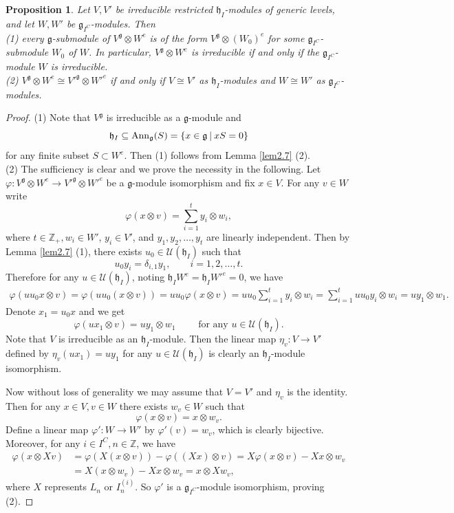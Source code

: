 \documentclass[12pt, reqno]{amsart}
\numberwithin{equation}{section}
\newtheorem{proposition}[theorem]{Proposition}%
\numberwithin{equation}{section}
\def\dt{\delta}
\def\h{\mathfrak{h}}
\def\g{\mathfrak{g}}
\def\vf{\varphi}
\def\gic{{\g_{I^C}}}
\def\U{\mathcal{U}}
\newcommand{\Z}{\mathbb{Z}}
\newcommand{\elei}[2]{I_{#1}^{(#2)}}
\begin{document}
\begin{proposition}\label{proptengmod}
 Let $V,V'$ be irreducible restricted $\h_I$-modules of generic levels,
 and let $W,W'$ be $\g_{I^C}$-modules.
Then\\
 (1) every $\g$-submodule of $V^{\g}\otimes W^e$ is of the form $V^\g\otimes (W_0)^e$ for some $\gic$-submodule $W_0$ of $W$. In particular,  $V^{\g}\otimes W^e$ is irreducible if and only if the $\gic$-module $W$ is irreducible.\\
 (2)  $V^{\g}\otimes W^e\cong V'^{\g}\otimes W'^e$ if and only if $V\cong V'$ as $\h_I$-modules and $W\cong W'$ as $\gic$-modules.
\end{proposition}
\begin{proof}
 (1) Note that $V^\g$ is irreducible as a $\g$-module and
  $$\h_{I}\subseteq\mathrm{Ann}_\g(S)=\{x\in\g\ \vline\ xS=0\}$$
  for any finite subset $S\subset W^e$.
  Then (1) follows from Lemma \ref{lem2.7} (2).\\
  (2) The sufficiency is clear and we prove the necessity in the following.
  Let $\vf:V^{\g}\otimes W^e\longrightarrow V'^{\g}\otimes W'^e$ be
  a $\g$-module isomorphism and fix $x\in V$.
  For any $v\in W$ write
  $$\vf(x\otimes v)=\sum_{i=1}^ty_i\otimes w_i,$$
  where $t\in\Z_+, w_i\in W'$, $y_i\in V'$, and $y_1,y_2,\dots,y_t$ are linearly independent.
  Then by Lemma \ref{lem2.7} (1), there exists $u_0\in\U(\h_I)$ such that
  $$u_0y_i=\dt_{i,1}y_1,\qquad i=1,2,\dots,t.$$
  Therefore for any $u\in\U(\h_I)$, noting $\h_IW^e=\h_IW'^e=0$, we have
  \begin{align*}
   \vf(uu_0x\otimes v)=\vf(uu_0(x\otimes v))=uu_0\vf(x\otimes v)=uu_0\sum_{i=1}^ty_i\otimes w_i
   =\sum_{i=1}^tuu_0y_i\otimes w_i=uy_1\otimes w_1.
  \end{align*}
  Denote $x_1=u_0x$ and we get
  $$\vf(ux_1\otimes v)=uy_1\otimes w_1\qquad\text{ for any }u\in\U(\h_I).$$
  Note that $V$ is irreducible as an $\h_I$-module.
  Then the linear map $\eta_v:V\longrightarrow V'$ defined by $\eta_v(ux_1)=uy_1$ for any $u\in\U(\h_I)$ is clearly an $\h_I$-module isomorphism.

  Now without loss of generality we may assume that $V=V'$ and $\eta_v$ is the identity.
  Then for any $x\in V, v\in W$ there exists $w_v\in W$ such that
  $$\vf(x\otimes v)=x\otimes w_v.$$
  Define a linear map $\vf':W\longrightarrow W'$ by $\vf'(v)=w_v$, which is clearly bijective.
  Moreover, for any $i\in I^C, n\in\Z$, we have
  \begin{align*}
   \vf(x\otimes Xv)&=\vf(X(x\otimes v))-\vf((Xx)\otimes v)=X\vf(x\otimes v)-Xx\otimes w_v\\
                   &=X(x\otimes w_v)-Xx\otimes w_v=x\otimes Xw_v,
  \end{align*}
  where $X$ represents $L_n$ or $\elei ni$.
  So $\vf'$ is a $\gic$-module isomorphism, proving (2).
\end{proof}
\end{document}
